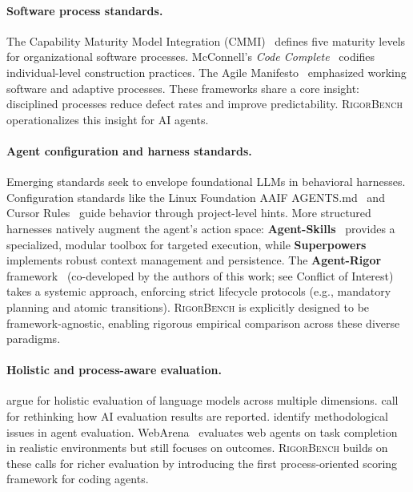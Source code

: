 \documentclass[letterpaper, 10 pt, conference]{ieeeconf}
\newcommand{\bench}{\textsc{RigorBench}}
\begin{document}
\paragraph{Software process standards.}
The Capability Maturity Model Integration (CMMI)~\cite{cmmi2018} defines five maturity levels for organizational software processes.
McConnell's \emph{Code Complete}~\cite{mcconnell2004codecomplete} codifies individual-level construction practices.
The Agile Manifesto~\cite{beck2001agile} emphasized working software and adaptive processes.
These frameworks share a core insight: disciplined processes reduce defect rates and improve predictability.
\bench{} operationalizes this insight for AI agents.

\paragraph{Agent configuration and harness standards.}
Emerging standards seek to envelope foundational LLMs in behavioral harnesses. Configuration standards like the Linux Foundation AAIF AGENTS.md~\cite{linuxfoundation2024agentsmd} and Cursor Rules~\cite{cursor2024rules} guide behavior through project-level hints.
More structured harnesses natively augment the agent's action space: \textbf{Agent-Skills}~\cite{osmani2024agentskills} provides a specialized, modular toolbox for targeted execution, while \textbf{Superpowers}~\cite{obra2024superpowers} implements robust context management and persistence. The \textbf{Agent-Rigor} framework~\cite{bhaskar2026agentrigor} (co-developed by the authors of this work; see Conflict of Interest) takes a systemic approach, enforcing strict lifecycle protocols (e.g., mandatory planning and atomic transitions). \bench{} is explicitly designed to be framework-agnostic, enabling rigorous empirical comparison across these diverse paradigms.

\paragraph{Holistic and process-aware evaluation.}
\cite{liang2023holistic} argue for holistic evaluation of language models across multiple dimensions.
\cite{burnell2023rethink} call for rethinking how AI evaluation results are reported.
\cite{kapoor2024ai} identify methodological issues in agent evaluation.
WebArena~\cite{zhou2024webarena} evaluates web agents on task completion in realistic environments but still focuses on outcomes.
\bench{} builds on these calls for richer evaluation by introducing the first process-oriented scoring framework for coding agents.
\end{document}
